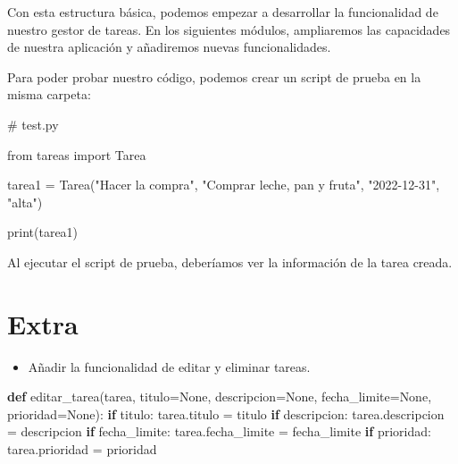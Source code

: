 \documentclass[
  a4paper,
  DIV=11,
  numbers=noendperiod,
  onepage,
  openany]{scrreprt}
\newenvironment{Shaded}{\begin{snugshade}}{\end{snugshade}}
\newcommand{\AttributeTok}[1]{\textcolor[rgb]{0.40,0.45,0.13}{#1}}
\newcommand{\BuiltInTok}[1]{\textcolor[rgb]{0.00,0.23,0.31}{#1}}
\newcommand{\CommentTok}[1]{\textcolor[rgb]{0.37,0.37,0.37}{#1}}
\newcommand{\ControlFlowTok}[1]{\textcolor[rgb]{0.00,0.23,0.31}{\textbf{#1}}}
\newcommand{\ExtensionTok}[1]{\textcolor[rgb]{0.00,0.23,0.31}{#1}}
\newcommand{\ImportTok}[1]{\textcolor[rgb]{0.00,0.46,0.62}{#1}}
\newcommand{\KeywordTok}[1]{\textcolor[rgb]{0.00,0.23,0.31}{\textbf{#1}}}
\newcommand{\NormalTok}[1]{\textcolor[rgb]{0.00,0.23,0.31}{#1}}
\newcommand{\OperatorTok}[1]{\textcolor[rgb]{0.37,0.37,0.37}{#1}}
\newcommand{\StringTok}[1]{\textcolor[rgb]{0.13,0.47,0.30}{#1}}
\newcommand{\VariableTok}[1]{\textcolor[rgb]{0.07,0.07,0.07}{#1}}
\providecommand{\tightlist}{%
  \setlength{\itemsep}{0pt}\setlength{\parskip}{0pt}}\usepackage{longtable,booktabs,array}
\begin{document}
Con esta estructura básica, podemos empezar a desarrollar la
funcionalidad de nuestro gestor de tareas. En los siguientes módulos,
ampliaremos las capacidades de nuestra aplicación y añadiremos nuevas
funcionalidades.

Para poder probar nuestro código, podemos crear un script de prueba en
la misma carpeta:

\begin{Shaded}
\begin{Highlighting}[]
\CommentTok{\# test.py}

\ImportTok{from}\NormalTok{ tareas }\ImportTok{import}\NormalTok{ Tarea}

\NormalTok{tarea1 }\OperatorTok{=}\NormalTok{ Tarea(}\StringTok{"Hacer la compra"}\NormalTok{, }\StringTok{"Comprar leche, pan y fruta"}\NormalTok{, }\StringTok{"2022{-}12{-}31"}\NormalTok{, }\StringTok{"alta"}\NormalTok{)}

\BuiltInTok{print}\NormalTok{(tarea1)}
\end{Highlighting}
\end{Shaded}

Al ejecutar el script de prueba, deberíamos ver la información de la
tarea creada.

\begin{Shaded}
\end{Shaded}

\chapter{Extra 🎁}\label{extra}

\begin{itemize}
\tightlist
\item
  Añadir la funcionalidad de editar y eliminar tareas.
\end{itemize}

\begin{Shaded}
\begin{Highlighting}[]
\KeywordTok{def}\NormalTok{ editar\_tarea(tarea, titulo}\OperatorTok{=}\VariableTok{None}\NormalTok{, descripcion}\OperatorTok{=}\VariableTok{None}\NormalTok{, fecha\_limite}\OperatorTok{=}\VariableTok{None}\NormalTok{, prioridad}\OperatorTok{=}\VariableTok{None}\NormalTok{):}
    \ControlFlowTok{if}\NormalTok{ titulo:}
\NormalTok{        tarea.titulo }\OperatorTok{=}\NormalTok{ titulo}
    \ControlFlowTok{if}\NormalTok{ descripcion:}
\NormalTok{        tarea.descripcion }\OperatorTok{=}\NormalTok{ descripcion}
    \ControlFlowTok{if}\NormalTok{ fecha\_limite:}
\NormalTok{        tarea.fecha\_limite }\OperatorTok{=}\NormalTok{ fecha\_limite}
    \ControlFlowTok{if}\NormalTok{ prioridad:}
\NormalTok{        tarea.prioridad }\OperatorTok{=}\NormalTok{ prioridad}
\end{Highlighting}
\end{Shaded}
\end{document}
